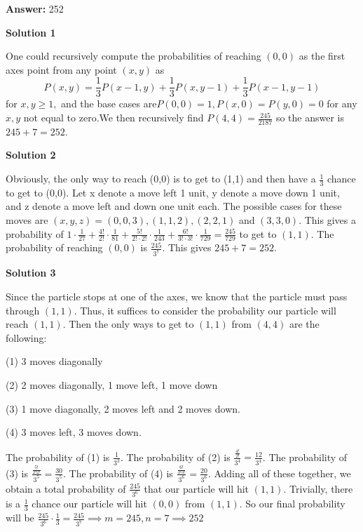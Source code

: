 \begin{enumerate}
 
 \textbf{Answer: }252



\textbf{Solution 1}

One could recursively compute the probabilities of reaching $(0,0)$ as the first axes point from any point $(x,y)$ as 
 \[P(x,y) = \frac{1}{3} P(x-1,y) + \frac{1}{3} P(x,y-1) + \frac{1}{3} P(x-1,y-1)\] for $x,y \geq 1,$ and the base cases are$P(0,0) = 1, P(x,0) = P(y,0) = 0$ for any $x,y$ not equal to zero.We then recursively find $P(4,4) = \frac{245}{2187}$ so the answer is $245 + 7 = \boxed{252}$.

 


 



\textbf{Solution 2}

Obviously, the only way to reach (0,0) is to get to (1,1) and then have a $\frac{1}{3}$ chance to get to (0,0). Let x denote a move left 1 unit, y denote a move down 1 unit, and z denote a move left and down one unit each. The possible cases for these moves are $(x,y,z)=(0,0,3),(1,1,2),(2,2,1)$ and $(3,3,0)$. This gives a probability of $1 \cdot \frac{1}{27} + \frac{4!}{2!} \cdot \frac{1}{81} + \frac{5!}{2! \cdot 2!} \cdot \frac{1}{243} +\frac{6!}{3! \cdot 3!} \cdot \frac{1}{729}=\frac{245}{729}$ to get to $(1,1)$. The probability of reaching $(0,0)$ is $\frac{245}{3^7}$. This gives $245+7=\boxed{252}$. 

 



\textbf{Solution 3}

Since the particle stops at one of the axes, we know that the particle must pass through $(1,1)$. Thus, it suffices to consider the probability our particle will reach $(1,1)$. Then the only ways to get to $(1,1)$ from $(4,4)$ are the following:

 (1) 3 moves diagonally    

 (2) 2 moves diagonally, 1 move left, 1 move down 

 (3) 1 move diagonally, 2 moves left and 2 moves down. 

 (4) 3 moves left, 3 moves down.

 The probability of (1) is $\frac{1}{3^3}$. The probability of (2) is $\frac{\frac{4!}{2!}}{3^4} = \frac{12}{3^4}$. The probability of (3) is $\frac{\frac{5!}{2!2!}}{3^5} = \frac{30}{3^5}$. The probability of (4) is $\frac{\frac{6!}{3!3!}}{3^6} = \frac{20}{3^6}$. Adding all of these together, we obtain a total probability of $\frac{245}{3^6}$ that our particle will hit $(1,1)$. Trivially, there is a $\frac{1}{3}$ chance our particle will hit $(0,0)$ from $(1,1)$. So our final probability will be $\frac{245}{3^6} \cdot \frac{1}{3} = \frac{245}{3^7} \implies m = 245, n = 7 \implies \boxed{252}$





\end{enumerate}
